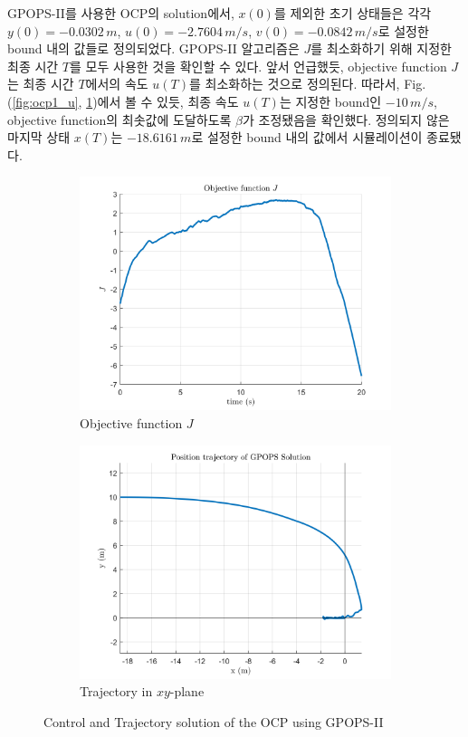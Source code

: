 GPOPS-II를 사용한 OCP의 solution에서, $x(0)$를 제외한 초기 상태들은 각각 $y(0) = -0.0302\,m$, $u(0) = -2.7604\,m/s$, $v(0) = -0.0842\,m/s$로 설정한 bound 내의 값들로 정의되었다.
GPOPS-II 알고리즘은 $J$를 최소화하기 위해 지정한 최종 시간 $T$를 모두 사용한 것을 확인할 수 있다.
앞서 언급했듯, objective function $J$는 최종 시간 $T$에서의 속도 $u(T)$를 최소화하는 것으로 정의된다.
따라서, Fig. (\ref{fig:ocp1_u}, \ref{fig:ocp1_obj})에서 볼 수 있듯, 최종 속도 $u(T)$는 지정한 bound인 $-10\,m/s$, objective function의 최솟값에 도달하도록 $\beta$가 조정됐음을 확인했다.
정의되지 않은 마지막 상태 $x(T)$는 $-18.6161\,m$로 설정한 bound 내의 값에서 시뮬레이션이 종료됐다.

\begin{figure}[ht]
	\centering
	\begin{subfigure}[b]{0.49\linewidth}
		\includegraphics[width=\linewidth]{figures/ObjFcn.png}
		\caption{Objective function $J$}
		\label{fig:ocp1_obj}
	\end{subfigure}
	\hfill
	\begin{subfigure}[b]{0.49\linewidth}
		\includegraphics[width=\linewidth]{figures/TrajXY.png}
		\caption{Trajectory in $xy$-plane}
		\label{fig:ocp1_xy}
	\end{subfigure}
	\caption{Control and Trajectory solution of the OCP using GPOPS-II}
	\label{fig:ocp1_control}
\end{figure}

